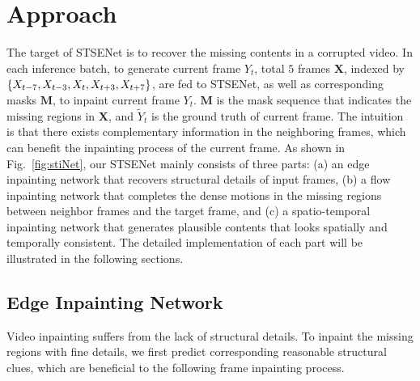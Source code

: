 \section{Approach}
\label{sec:approach}

The target of STSENet is to recover the missing contents in a corrupted video.
In each inference batch, to generate current frame \(Y_t\), total $5$ frames $\boldsymbol{X}$, indexed by $\{X_{t-7},X_{t-3},X_{t},X_{t+3},X_{t+7}\}$, are fed to STSENet, as well as corresponding masks $\boldsymbol{M}$, to inpaint current frame \(Y_t\).
$\boldsymbol{M}$ is the mask sequence that indicates the missing regions in $\boldsymbol{X}$, and \( \widetilde{Y}_t\) is the ground truth of current frame.
%
The intuition is that there exists complementary information in the neighboring frames, which can benefit the inpainting process of the current frame.
As shown in Fig.~\ref{fig:stiNet}, our STSENet mainly consists of three parts: (a) an edge inpainting network that recovers structural details of input frames, (b) a flow inpainting network that completes the dense motions in the missing regions between neighbor frames and the target frame, and (c) a spatio-temporal inpainting network that generates plausible contents that looks spatially and temporally consistent.
The detailed implementation of each part will be illustrated in the following sections.











\subsection{Edge Inpainting Network}
\label{sec:edgenet}

Video inpainting suffers from the lack of structural details.
To inpaint the missing regions with fine details, we first predict corresponding reasonable structural clues, which are beneficial to the following frame inpainting process.
%

